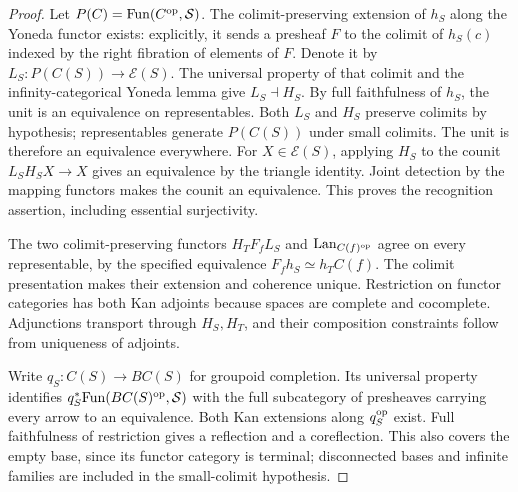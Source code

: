 \begin{proof}
Let $P(C)=\mathrm{Fun}(C^{\mathrm{op}},\mathcal S)$. The colimit-preserving extension of $h_S$ along the Yoneda functor exists: explicitly, it sends a presheaf $F$ to the colimit of $h_S(c)$ indexed by the right fibration of elements of $F$. Denote it by $L_S:P(C(S))\to\mathscr E(S)$. The universal property of that colimit and the infinity-categorical Yoneda lemma give $L_S\dashv H_S$. By full faithfulness of $h_S$, the unit is an equivalence on representables. Both $L_S$ and $H_S$ preserve colimits by hypothesis; representables generate $P(C(S))$ under small colimits. The unit is therefore an equivalence everywhere. For $X\in\mathscr E(S)$, applying $H_S$ to the counit $L_SH_SX\to X$ gives an equivalence by the triangle identity. Joint detection by the mapping functors makes the counit an equivalence. This proves the recognition assertion, including essential surjectivity.

The two colimit-preserving functors $H_TF_fL_S$ and $\mathrm{Lan}_{C(f)^{\mathrm{op}}}$ agree on every representable, by the specified equivalence $F_fh_S\simeq h_TC(f)$. The colimit presentation makes their extension and coherence unique. Restriction on functor categories has both Kan adjoints because spaces are complete and cocomplete. Adjunctions transport through $H_S,H_T$, and their composition constraints follow from uniqueness of adjoints.

Write $q_S:C(S)\to BC(S)$ for groupoid completion. Its universal property identifies $q_S^*\mathrm{Fun}(BC(S)^{\mathrm{op}},\mathcal S)$ with the full subcategory of presheaves carrying every arrow to an equivalence. Both Kan extensions along $q_S^{\mathrm{op}}$ exist. Full faithfulness of restriction gives a reflection and a coreflection. This also covers the empty base, since its functor category is terminal; disconnected bases and infinite families are included in the small-colimit hypothesis.
\end{proof}

